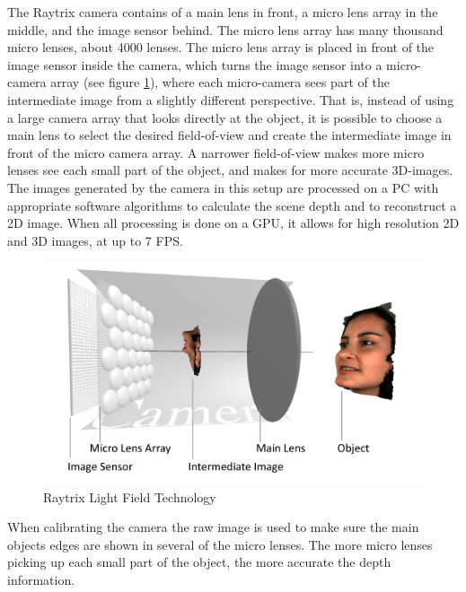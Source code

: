 The Raytrix camera contains of a main lens in front, a micro lens array in the middle, and the image sensor behind. The micro lens array has many thousand micro lenses, about 4000 lenses. The micro lens array is placed in front of the image sensor inside the camera, which turns the image sensor into a micro-camera array (see figure \ref{fig:light_field}), where each micro-camera sees part of the intermediate image from a slightly different perspective. That is, instead of using a large camera array that looks directly at the object, it is possible to choose a main lens to select the desired field-of-view and create the intermediate image in front of the micro camera array. A narrower field-of-view makes more micro lenses see each small part of the object, and makes for more accurate 3D-images. The images generated by the camera in this setup are processed on a PC with appropriate software algorithms to calculate the scene depth and to reconstruct a 2D image. When all processing is done on a GPU, it allows for high resolution 2D and 3D images, at up to 7 FPS. \cite{website:raytrix_technology}

\begin{figure}[h]
    \centering
    \includegraphics[width=.9\linewidth]{images/hardware/Light-Field-Camera-Schematic}
    \caption{Raytrix Light Field Technology\cite{website:raytrix_technology}}
    \label{fig:light_field}
\end{figure}

When calibrating the camera the raw image is used to make sure the main objects edges are shown in several of the micro lenses. The more micro lenses picking up each small part of the object, the more accurate the depth information. 

